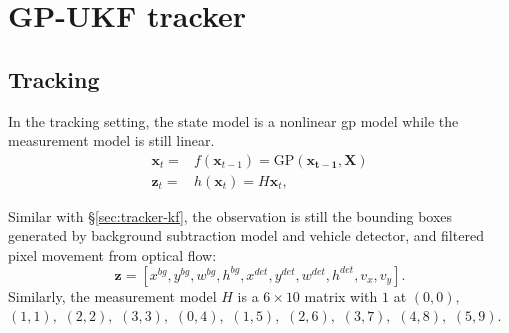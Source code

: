 \section{GP-UKF tracker}
\label{sec:gp-ukf}

\subsection{Tracking}

In the tracking setting, the state model is a nonlinear \gls{gp} model while the measurement model is still linear.
\begin{align}
\mathbf{x}_t = & f(\mathbf{x}_{t-1}) = \text{GP}(\mathbf{x_{t-1}}, \mathbf{X}) \\
\mathbf{z}_t = & h(\mathbf{x}_t) = H\mathbf{x}_t,
\end{align}

Similar with \S\ref{sec:tracker-kf}, the observation is still the bounding boxes generated by background subtraction model and vehicle detector, and filtered pixel movement from optical flow: 
$$\mathbf{z}=[x^{bg}, y^{bg}, w^{bg}, h^{bg}, x^{det}, y^{det}, w^{det}, h^{det}, v_x, v_y].$$ 
Similarly, the measurement model $H$ is a $6\times10$ matrix with $1$ at $(0, 0),$ $(1, 1),$ $(2, 2),$ $(3, 3),$ $(0, 4),$ $(1, 5),$ $(2, 6),$ $(3, 7),$ $(4, 8),$ $(5,9)$.

